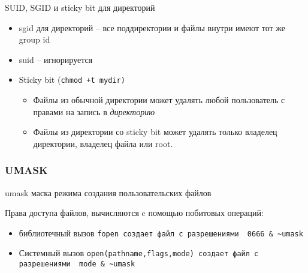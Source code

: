\begin{frame}{SUID, SGID и sticky bit для директорий}
	\begin{itemize}
		\item sgid для директорий -- все поддиректории и файлы внутри имеют тот же group id
		\item suid -- игнорируется
		\item Sticky bit (\tt{chmod +t mydir})
          \begin{itemize}
            \item Файлы из обычной директории может удалять любой пользователь с правами на запись в \emph{директорию}
            \item Файлы из директории со sticky bit может удалять только владелец директории, владелец файла или root.
          \end{itemize} 
	\end{itemize}
\end{frame}

\begin{frame}[fragile]
 \frametitle{UMASK}

	\begin{block}{umask}
		маска режима создания пользовательских файлов
	\end{block}

	Права доступа файлов, вычисляются c помощью побитовых операций:
    \begin{itemize}
      \item библиотечный вызов \tt{fopen} создает файл с разрешениями 
     \verb+ 0666 & ~umask +
      \item Системный вызов \tt{open(pathname,flags,mode)} создает файл с разрешениями \verb+ mode & ~umask +
   \end{itemize}
        

\end{frame}



